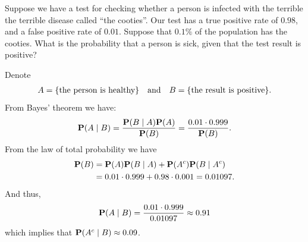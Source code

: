 \documentclass[11pt,a4paper]{article}
\begin{document}
\begin{exercise}
  Suppose we have a test for checking whether a person is
  infected with the terrible the terrible disease called ``the cooties''.
  Our test has a true positive rate of $0.98$, and a false positive rate of
  $0.01$.
  Suppose that $0.1\%$ of the population has the cooties.
  What is the probability that a person is sick,
  given that the test result is positive?
\end{exercise}
\begin{solution}
  Denote
  \begin{align*}
    A = \{\text{the person is healthy}\} \quad \text{and} \quad
    B = \{\text{the result is positive}\}.
  \end{align*}
  From Bayes' theorem we have:
  \[
    \mathbf{P}(A \mid B) = 
    \frac{\mathbf{P}(B \mid A) \mathbf{P}(A)}{\mathbf{P}(B)} = 
    \frac{0.01 \cdot 0.999}{\mathbf{P}(B)}.
  \]
  From the law of total probability we have
  \begin{align*}
    \mathbf{P}(B) &= 
    \mathbf{P}(A)\mathbf{P}(B \mid A) + 
    \mathbf{P}(A^{c})\mathbf{P}(B \mid A^{c}) \\ &= 
    0.01 \cdot 0.999 + 0.98 \cdot 0.001 = 0.01097.
  \end{align*}
  And thus,
  \[
    \mathbf{P}(A \mid B) =
    \frac{0.01 \cdot 0.999}{0.01097} \approx 0.91
  \]
  which implies that $\mathbf{P}(A^c \mid B) \approx 0.09$.
\end{solution}
\end{document}
